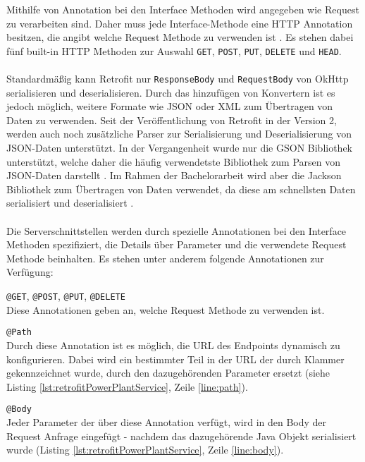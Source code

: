 Mithilfe von Annotation bei den Interface Methoden wird angegeben wie Request zu verarbeiten sind. Daher muss jede Interface-Methode eine HTTP Annotation besitzen, die angibt welche Request Methode zu verwenden ist \cite{retrofit}. Es stehen dabei fünf built-in HTTP Methoden zur Auswahl \texttt{GET}, \texttt{POST}, \texttt{PUT}, \texttt{DELETE} und \texttt{HEAD}.
\\\\
Standardmäßig kann Retrofit nur \texttt{ResponseBody} und \texttt{RequestBody} von OkHttp serialisieren und deserialisieren. Durch das hinzufügen von Konvertern ist es jedoch möglich, weitere Formate wie JSON oder XML zum Übertragen von Daten zu verwenden. Seit der Veröffentlichung von Retrofit in der Version 2, werden auch noch zusätzliche Parser zur Serialisierung und Deserialisierung von JSON-Daten unterstützt. In der Vergangenheit wurde nur die GSON Bibliothek unterstützt, welche daher die häufig verwendetste Bibliothek zum Parsen von JSON-Daten darstellt \cite{consumingRetrofit}. Im Rahmen der Bachelorarbeit wird aber die Jackson Bibliothek zum Übertragen von Daten verwendet, da diese am schnellsten Daten serialisiert und deserialisiert  \cite{json:evaluation}.
\\\\
Die Serverschnittstellen werden durch spezielle Annotationen bei den Interface Methoden spezifiziert, die Details über Parameter und die verwendete Request Methode beinhalten. Es stehen unter anderem folgende Annotationen zur Verfügung:

\begin{list}{-}{}
	\item \texttt{@GET}, \texttt{@POST}, \texttt{@PUT}, \texttt{@DELETE}\\
	Diese Annotationen geben an, welche Request Methode zu verwenden ist.
	\item \texttt{@Path} \\
	Durch diese Annotation ist es möglich, die URL des Endpoints dynamisch zu konfigurieren. Dabei wird ein bestimmter Teil in der URL der durch Klammer gekennzeichnet wurde, durch den dazugehörenden Parameter ersetzt (siehe Listing \ref{lst:retrofitPowerPlantService}, Zeile \ref{line:path}).
	\item \texttt{@Body} \\
	Jeder Parameter der über diese Annotation verfügt, wird in den Body der Request Anfrage eingefügt - nachdem das dazugehörende Java Objekt serialisiert wurde (Listing \ref{lst:retrofitPowerPlantService}, Zeile \ref{line:body}).
\end{list}

